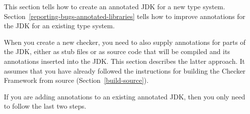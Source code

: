 
This section tells how to create an annotated JDK for a new type system.
Section~\ref{reporting-bugs-annotated-libraries} tells how to improve
annotations for the JDK for an existing type system.

When you create a new checker, you need to also supply annotations for
parts of the JDK, either as stub files or as source code that will be
compiled and its annotations inserted into the JDK\@.  This
section describes the latter approach.
It assumes that you have already followed the instructions for building the
Checker Framework from source (Section~\ref{build-source}).

If you are adding annotations to an existing annotated JDK, then you only
need to follow the last two steps.

